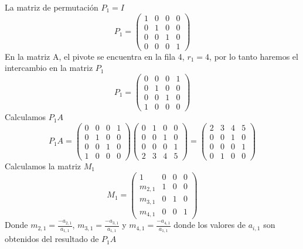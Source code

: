 La matriz de permutación $P_1 = I$
\[ P_1 =
    \left( \begin{array}{cccc}
    1 & 0 & 0 & 0\\
    0 & 1 & 0 & 0\\ 
    0 & 0 & 1 & 0\\ 
    0 & 0 & 0 & 1
    \end{array} \right) 
\]
En la matriz A, el pivote se encuentra en la fila 4, $r_1 = 4$, por lo tanto haremos el intercambio en la matriz $P_1$
\[ P_1 =
    \left( \begin{array}{cccc}
    0 & 0 & 0 & 1\\
    0 & 1 & 0 & 0\\ 
    0 & 0 & 1 & 0\\ 
    1 & 0 & 0 & 0
    \end{array} \right) 
\]
Calculamos $P_{1}A $
\[ P_{1}A =
    \left( \begin{array}{cccc}
    0 & 0 & 0 & 1\\
    0 & 1 & 0 & 0\\ 
    0 & 0 & 1 & 0\\ 
    1 & 0 & 0 & 0
    \end{array} \right)\left( \begin{array}{cccc}
    0 & 1 & 0 & 0\\
    0 & 0 & 1 & 0\\ 
    0 & 0 & 0 & 1\\ 
    2 & 3 & 4 & 5
    \end{array} \right) =
    \left( \begin{array}{cccc}
    2 & 3 & 4 & 5\\
    0 & 0 & 1 & 0\\ 
    0 & 0 & 0 & 1\\ 
    0 & 1 & 0 & 0
    \end{array} \right) 
\]
Calculamos la matriz $M_1$
\[ M_1 =
    \left( \begin{array}{cccc}
    1 & 0 & 0 & 0\\
    m_{2,1} & 1 & 0 & 0\\ 
    m_{3,1} & 0 & 1 & 0\\ 
    m_{4,1} & 0 & 0 & 1
    \end{array} \right) 
\]
Donde $m_{2,1} = \frac{-a_{2,1}}{a_{1,1}}$, $m_{3,1} = \frac{-a_{3,1}}{a_{1,1}}$ y $m_{4,1} = \frac{-a_{4,1}}{a_{1,1}}$ donde los valores de $a_{i,1}$ son obtenidos del resultado de $P_{1}A $ \\

